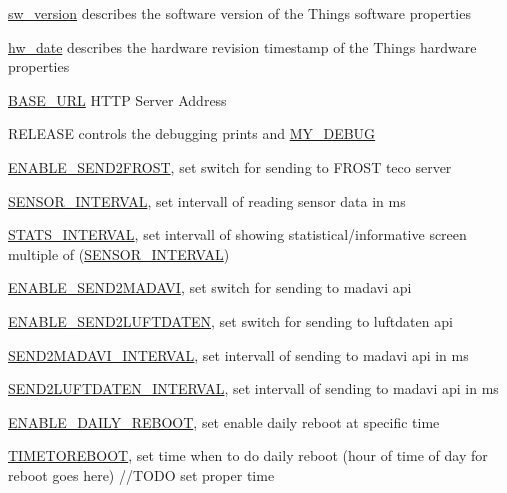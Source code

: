 \begin{DoxyItemize}
\begin{DoxyItemize}
\item \mbox{\hyperlink{main_8h_af06baee05280c189592215d5ea08e7ef}{sw\+\_\+version}} describes the software version of the Thing\textquotesingle{}s software properties
\item \mbox{\hyperlink{main_8h_acbd8a4cec684c263a6cc312c70d45ef3}{hw\+\_\+date}} describes the hardware revision timestamp of the Thing\textquotesingle{}s hardware properties
\item \mbox{\hyperlink{main_8h_acbb11c1e34784cf1e3147029f942bfd6}{B\+A\+S\+E\+\_\+\+U\+RL}} H\+T\+TP Server Address
\item R\+E\+L\+E\+A\+SE controls the debugging prints and \mbox{\hyperlink{main_8h_a7e7232f278193dd8684f973ee70ef3f5}{M\+Y\+\_\+\+D\+E\+B\+UG}}
\item \mbox{\hyperlink{main_8h_af58473239b566ebd1187b4cc8c71e97d}{E\+N\+A\+B\+L\+E\+\_\+\+S\+E\+N\+D2\+F\+R\+O\+ST}}, set switch for sending to F\+R\+O\+ST teco server
\item \mbox{\hyperlink{main_8h_a71a7a65f7dd7e8f3ea14942213cd8217}{S\+E\+N\+S\+O\+R\+\_\+\+I\+N\+T\+E\+R\+V\+AL}}, set intervall of reading sensor data in ms
\item \mbox{\hyperlink{main_8h_aef6021251fa63b1e73a98864b809904e}{S\+T\+A\+T\+S\+\_\+\+I\+N\+T\+E\+R\+V\+AL}}, set intervall of showing statistical/informative screen multiple of (\mbox{\hyperlink{main_8h_a71a7a65f7dd7e8f3ea14942213cd8217}{S\+E\+N\+S\+O\+R\+\_\+\+I\+N\+T\+E\+R\+V\+AL}})
\item \mbox{\hyperlink{main_8h_a18d121e3e45bfea386799ad36fb70b5f}{E\+N\+A\+B\+L\+E\+\_\+\+S\+E\+N\+D2\+M\+A\+D\+A\+VI}}, set switch for sending to madavi api
\item \mbox{\hyperlink{main_8h_ace6bf58c74189bcd567c1135baaa9505}{E\+N\+A\+B\+L\+E\+\_\+\+S\+E\+N\+D2\+L\+U\+F\+T\+D\+A\+T\+EN}}, set switch for sending to luftdaten api
\item \mbox{\hyperlink{main_8h_a6f4b34eadf0db60197dce3a76e0d6632}{S\+E\+N\+D2\+M\+A\+D\+A\+V\+I\+\_\+\+I\+N\+T\+E\+R\+V\+AL}}, set intervall of sending to madavi api in ms
\item \mbox{\hyperlink{main_8h_a7a63477c73052322ebb3ea6f1bfe7e1d}{S\+E\+N\+D2\+L\+U\+F\+T\+D\+A\+T\+E\+N\+\_\+\+I\+N\+T\+E\+R\+V\+AL}}, set intervall of sending to madavi api in ms
\item \mbox{\hyperlink{main_8h_a18bdfe88e9f5895863740df7ad801109}{E\+N\+A\+B\+L\+E\+\_\+\+D\+A\+I\+L\+Y\+\_\+\+R\+E\+B\+O\+OT}}, set enable daily reboot at specific time
\item \mbox{\hyperlink{main_8h_a423126ae538bf9e83239e46e46cf1df9}{T\+I\+M\+E\+T\+O\+R\+E\+B\+O\+OT}}, set time when to do daily reboot (hour of time of day for reboot goes here) //\+T\+O\+DO set proper time

\end{DoxyItemize}
\end{DoxyItemize}
